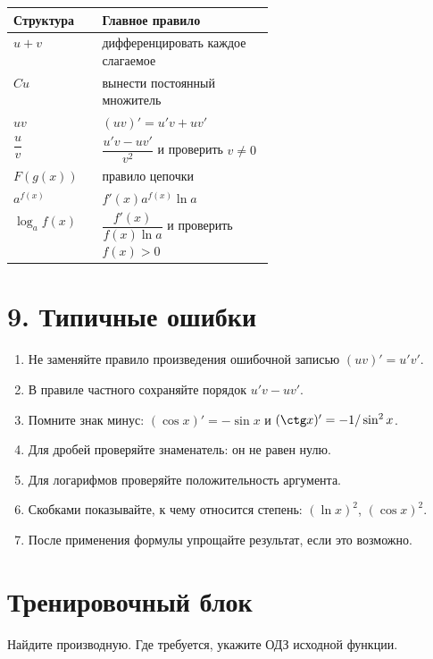 \documentclass[a4paper,12pt]{article}
\newcommand{\sectionline}{\vspace{0.25em}{\color{accent}\rule{\linewidth}{0.8pt}}\vspace{0.45em}}
\begin{document}
\begin{center}
\renewcommand{\arraystretch}{1.35}
\begin{tabularx}{\linewidth}{@{}>{\raggedright\arraybackslash}p{0.34\linewidth}X@{}}
\toprule
\textbf{Структура} & \textbf{Главное правило} \\
\midrule
$u+v$ & дифференцировать каждое слагаемое \\
$Cu$ & вынести постоянный множитель \\
$uv$ & $(uv)'=u'v+uv'$ \\
$\dfrac uv$ & $\dfrac{u'v-uv'}{v^2}$ и проверить $v\ne0$ \\
$F(g(x))$ & правило цепочки \\
$a^{f(x)}$ & $f'(x)a^{f(x)}\ln a$ \\
$\log_a f(x)$ & $\dfrac{f'(x)}{f(x)\ln a}$ и проверить $f(x)>0$ \\
\bottomrule
\end{tabularx}
\end{center}

\section*{\color{darkaccent}9. Типичные ошибки}
\sectionline

\begin{enumerate}
\item Не заменяйте правило произведения ошибочной записью $(uv)'=u'v'$.
\item В правиле частного сохраняйте порядок $u'v-uv'$.
\item Помните знак минус: $(\cos x)'=-\sin x$ и $(\ctg x)'=-1/\sin^2x$.
\item Для дробей проверяйте знаменатель: он не равен нулю.
\item Для логарифмов проверяйте положительность аргумента.
\item Скобками показывайте, к чему относится степень: $(\ln x)^2$, $(\cos x)^2$.
\item После применения формулы упрощайте результат, если это возможно.
\end{enumerate}

\clearpage
\section*{\color{darkaccent}Тренировочный блок}
\sectionline

Найдите производную. Где требуется, укажите ОДЗ исходной функции.
\end{document}
